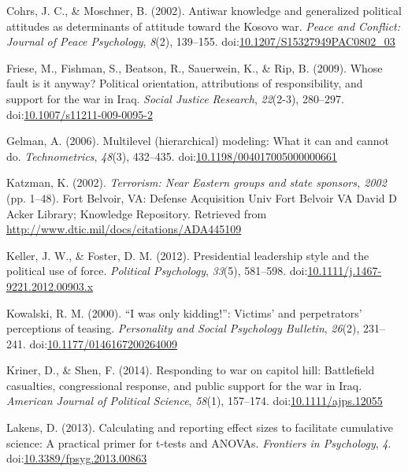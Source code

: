 \documentclass[english,,man,floatsintext]{apa6}
\begin{document}
\leavevmode\hypertarget{ref-Cohrs2002}{}%
Cohrs, J. C., \& Moschner, B. (2002). Antiwar knowledge and generalized political attitudes as determinants of attitude toward the Kosovo war. \emph{Peace and Conflict: Journal of Peace Psychology}, \emph{8}(2), 139--155. doi:\href{https://doi.org/10.1207/S15327949PAC0802_03}{10.1207/S15327949PAC0802\_03}

\leavevmode\hypertarget{ref-Friese2009}{}%
Friese, M., Fishman, S., Beatson, R., Sauerwein, K., \& Rip, B. (2009). Whose fault is it anyway? Political orientation, attributions of responsibility, and support for the war in Iraq. \emph{Social Justice Research}, \emph{22}(2-3), 280--297. doi:\href{https://doi.org/10.1007/s11211-009-0095-2}{10.1007/s11211-009-0095-2}

\leavevmode\hypertarget{ref-Gelman2006}{}%
Gelman, A. (2006). Multilevel (hierarchical) modeling: What it can and cannot do. \emph{Technometrics}, \emph{48}(3), 432--435. doi:\href{https://doi.org/10.1198/004017005000000661}{10.1198/004017005000000661}

\leavevmode\hypertarget{ref-Katzman2002}{}%
Katzman, K. (2002). \emph{Terrorism: Near Eastern groups and state sponsors, 2002} (pp. 1--48). Fort Belvoir, VA: Defense Acquisition Univ Fort Belvoir VA David D Acker Library; Knowledge Repository. Retrieved from \url{http://www.dtic.mil/docs/citations/ADA445109}

\leavevmode\hypertarget{ref-Keller2012}{}%
Keller, J. W., \& Foster, D. M. (2012). Presidential leadership style and the political use of force. \emph{Political Psychology}, \emph{33}(5), 581--598. doi:\href{https://doi.org/10.1111/j.1467-9221.2012.00903.x}{10.1111/j.1467-9221.2012.00903.x}

\leavevmode\hypertarget{ref-Kowalski2000}{}%
Kowalski, R. M. (2000). ``I was only kidding!'': Victims' and perpetrators' perceptions of teasing. \emph{Personality and Social Psychology Bulletin}, \emph{26}(2), 231--241. doi:\href{https://doi.org/10.1177/0146167200264009}{10.1177/0146167200264009}

\leavevmode\hypertarget{ref-Kriner2014}{}%
Kriner, D., \& Shen, F. (2014). Responding to war on capitol hill: Battlefield casualties, congressional response, and public support for the war in Iraq. \emph{American Journal of Political Science}, \emph{58}(1), 157--174. doi:\href{https://doi.org/10.1111/ajps.12055}{10.1111/ajps.12055}

\leavevmode\hypertarget{ref-Lakens2013}{}%
Lakens, D. (2013). Calculating and reporting effect sizes to facilitate cumulative science: A practical primer for t-tests and ANOVAs. \emph{Frontiers in Psychology}, \emph{4}. doi:\href{https://doi.org/10.3389/fpsyg.2013.00863}{10.3389/fpsyg.2013.00863}
\end{document}
